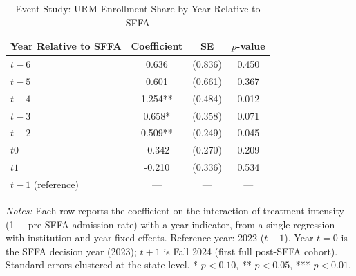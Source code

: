 \begin{table}[htbp]
\centering
\caption{Event Study: URM Enrollment Share by Year Relative to SFFA}
\label{tab:eventstudy}
\begin{threeparttable}
\begin{tabular}{lccc}
\toprule
Year Relative to SFFA & Coefficient & SE & $p$-value \\
\midrule
$t-6$ & 0.636 & (0.836) & 0.450 \\
$t-5$ & 0.601 & (0.661) & 0.367 \\
$t-4$ & 1.254** & (0.484) & 0.012 \\
$t-3$ & 0.658* & (0.358) & 0.071 \\
$t-2$ & 0.509** & (0.249) & 0.045 \\
$t0$ & -0.342 & (0.270) & 0.209 \\
$t1$ & -0.210 & (0.336) & 0.534 \\
\midrule
$t-1$ (reference) & --- & --- & --- \\
\bottomrule
\end{tabular}
\begin{tablenotes}[flushleft]\small
\item \textit{Notes:} Each row reports the coefficient on the interaction of treatment intensity (1 $-$ pre-SFFA admission rate) with a year indicator, from a single regression with institution and year fixed effects. Reference year: 2022 ($t-1$). Year $t=0$ is the SFFA decision year (2023); $t+1$ is Fall 2024 (first full post-SFFA cohort). Standard errors clustered at the state level. * $p < 0.10$, ** $p < 0.05$, *** $p < 0.01$.
\end{tablenotes}
\end{threeparttable}
\end{table}
